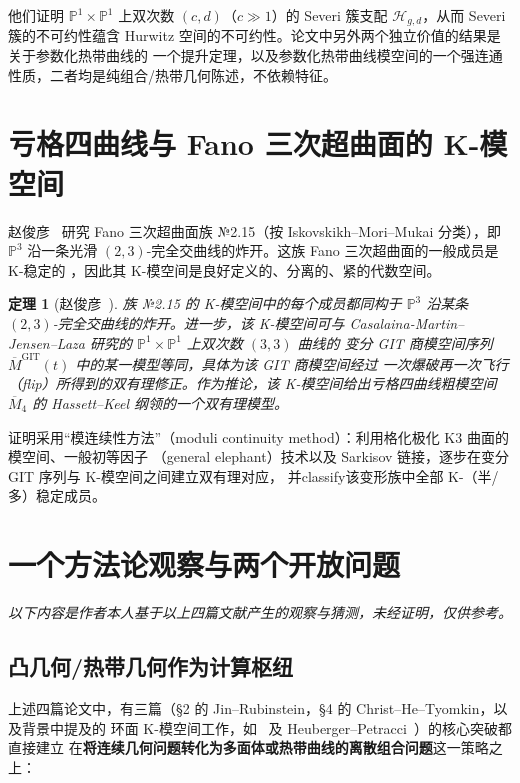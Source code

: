 \documentclass[11pt,a4paper]{article}
\newtheorem{theorem}{定理}[section]
\theoremstyle{definition}
\theoremstyle{remark}
\newcommand{\PP}{\mathbb{P}}
\begin{document}
他们证明 $\PP^1 \times \PP^1$ 上双次数 $(c,d)$（$c \gg 1$）的 Severi 簇支配 $\mathcal{H}_{g,d}$，从而
Severi 簇的不可约性蕴含 Hurwitz 空间的不可约性。论文中另外两个独立价值的结果是关于参数化热带曲线的
一个提升定理，以及参数化热带曲线模空间的一个强连通性质，二者均是纯组合/热带几何陈述，不依赖特征。

\section{亏格四曲线与 Fano 三次超曲面的 K-模空间}

赵俊彦~\cite{Zhao2025} 研究 Fano 三次超曲面族 №2.15（按 Iskovskikh--Mori--Mukai 分类），即
$\PP^3$ 沿一条光滑 $(2,3)$-完全交曲线的炸开。这族 Fano 三次超曲面的一般成员是 K-稳定的
\cite[Proposition 4.33]{ACCCKMSSV2023}，因此其 K-模空间是良好定义的、分离的、紧的代数空间。

\begin{theorem}[赵俊彦~{\cite[主定理]{Zhao2025}}]
族 №2.15 的 K-模空间中的每个成员都同构于 $\PP^3$ 沿某条 $(2,3)$-完全交曲线的炸开。进一步，该
K-模空间可与 Casalaina-Martin--Jensen--Laza 研究的 $\PP^1\times\PP^1$ 上双次数 $(3,3)$ 曲线的
变分 GIT 商模空间序列 $\overline{M}^{\mathrm{GIT}}(t)$ 中的某一模型等同，具体为该 GIT 商模空间经过
一次爆破再一次飞行（flip）所得到的双有理修正。作为推论，该 K-模空间给出亏格四曲线粗模空间
$\overline{M}_4$ 的 Hassett--Keel 纲领的一个双有理模型。
\end{theorem}

证明采用“模连续性方法”（moduli continuity method）：利用格化极化 K3 曲面的模空间、一般初等因子
（general elephant）技术以及 Sarkisov 链接，逐步在变分 GIT 序列与 K-模空间之间建立双有理对应，
并classify该变形族中全部 K-（半/多）稳定成员。

\section{一个方法论观察与两个开放问题}

\emph{以下内容是作者本人基于以上四篇文献产生的观察与猜测，未经证明，仅供参考。}

\subsection{凸几何/热带几何作为计算枢纽}

上述四篇论文中，有三篇（\S 2 的 Jin--Rubinstein，\S 4 的 Christ--He--Tyomkin，以及背景中提及的
环面 K-模空间工作，如~\cite{Zhao2025} 及 Heuberger--Petracci~\cite{HP2025}）的核心突破都直接建立
在\textbf{将连续几何问题转化为多面体或热带曲线的离散组合问题}这一策略之上：
\end{document}
